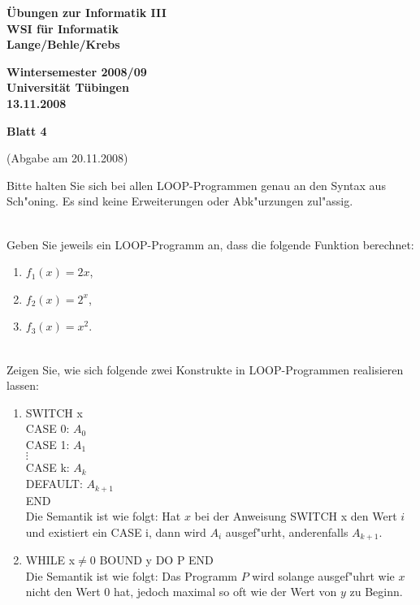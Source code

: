 \documentclass[a4paper]{article}
\def\header#1#2#3{\pagestyle{empty}
\noindent
\begin{minipage}[t]{0.6\textwidth}
\begin{flushleft}
\bf \"Ubungen zur Informatik III\\
WSI f\"ur Informatik\\
Lange/Behle/Krebs
\end{flushleft}
\end{minipage}
\begin{minipage}[t]{0.4\textwidth}
\begin{flushright}
\bf Wintersemester 2008/09\\
Universit\"at T\"ubingen\\
#2 %
\end{flushright}
\end{minipage}

\begin{center}
{\Large\bf Blatt #1}

{(Abgabe am #3)}
\end{center}
}
\begin{document}
\header{4}{13.11.2008}{20.11.2008}

\bigskip
\begin{center}
\end{center}


\bigskip
Bitte halten Sie sich bei allen LOOP-Programmen genau an den Syntax aus Sch"oning. Es sind keine Erweiterungen oder Abk"urzungen zul"assig.

\bigskip
{}\\
Geben Sie jeweils ein LOOP-Programm an, dass die folgende Funktion berechnet:
\begin{enumerate}
\item $f_1(x)=2x$,
\item $f_2(x)=2^x$,
\item $f_3(x)=x^2$.
\end{enumerate}
\bigskip

\\
Zeigen Sie, wie sich folgende zwei Konstrukte in LOOP-Programmen realisieren lassen:
\begin{enumerate}
\item

SWITCH x\\
CASE 0: $A_0$\\
CASE 1: $A_1$\\
$\vdots$\\
CASE k: $A_k$\\
DEFAULT: $A_{k+1}$\\
END\\

Die Semantik ist wie folgt: Hat $x$ bei der Anweisung SWITCH x den Wert $i$ und existiert ein CASE i, dann wird $A_i$ ausgef"urht, anderenfalls $A_{k+1}$. 

\item
WHILE x$\neq$0 BOUND y DO P END\\

Die Semantik ist wie folgt: Das Programm $P$ wird solange ausgef"uhrt wie $x$ nicht den Wert 0 hat, jedoch maximal so oft wie der Wert von $y$ zu Beginn.
\end{enumerate}
\end{document}

